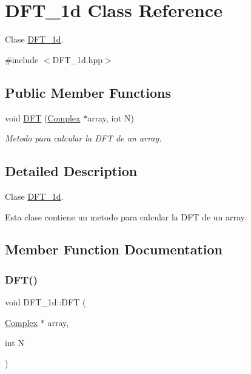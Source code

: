 \hypertarget{classDFT__1d}{}\section{D\+F\+T\+\_\+1d Class Reference}
\label{classDFT__1d}


Clase \hyperlink{classDFT__1d}{D\+F\+T\+\_\+1d}.  




{\ttfamily \#include $<$D\+F\+T\+\_\+1d.\+hpp$>$}

\subsection*{Public Member Functions}
\begin{DoxyCompactItemize}
\item 
void \hyperlink{classDFT__1d_a0be642be875ce52ddc2f27d0bbdba8f7}{D\+FT} (\hyperlink{classComplex}{Complex} $\ast$array, int N)
\begin{DoxyCompactList}\small\item\em Metodo para calcular la D\+FT de un array. \end{DoxyCompactList}\end{DoxyCompactItemize}


\subsection{Detailed Description}
Clase \hyperlink{classDFT__1d}{D\+F\+T\+\_\+1d}. 

Esta clase contiene un metodo para calcular la D\+FT de un array. 

\subsection{Member Function Documentation}
\mbox{\label{classDFT__1d_a0be642be875ce52ddc2f27d0bbdba8f7}} 
\subsubsection{\texorpdfstring{D\+F\+T()}{DFT()}}
{\footnotesize\ttfamily void D\+F\+T\+\_\+1d\+::\+D\+FT (\begin{DoxyParamCaption}\item[{\hyperlink{classComplex}{Complex} $\ast$}]{array,  }\item[{int}]{N }\end{DoxyParamCaption})}



